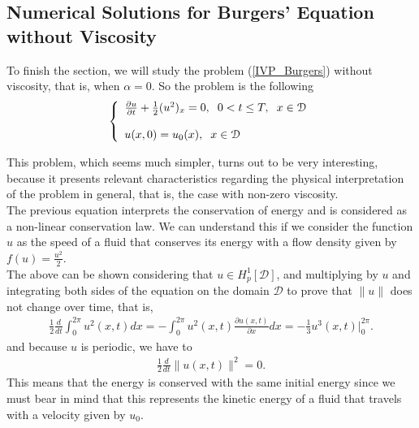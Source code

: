 \subsection{Numerical Solutions for Burgers' Equation without Viscosity}
	
	To finish the section, we will study the problem (\ref{IVP_Burgers}) without viscosity, that is, when $\alpha = 0$. So the problem is the following
	\begin{align}
	\label{IVP_Inviscid}
		\left \lbrace \begin{array}{ll}
			\frac{\partial u}{\partial t} + \frac{1}{2} (u^2)_x = 0, \hspace{2mm} 0 < t \leq T, \hspace{2mm} x \in \mathcal{D} \\
			\\
			u(x, 0) = u_0(x), \hspace{2mm} x \in \mathcal{D}
		\end{array}  \right .
	\end{align}
	
	This problem, which seems much simpler, turns out to be very interesting, because it presents relevant characteristics regarding the physical interpretation of the problem in general, that is, the case with non-zero viscosity. \\
	
	The previous equation interprets the conservation of energy and is considered as a non-linear conservation law. We can understand this if we consider the function $ u $ as the speed of a fluid that conserves its energy with a flow density given by $f(u) = \frac{u^2} {2}$. \\
	
	The above can be shown considering that $u \in H^1_p [\mathcal{D}]$, and multiplying by $u$ and integrating both sides of the equation on the domain $\mathcal{D}$ to prove that $\| u \|$ does not change over time, that is,
	\begin{align*}
		\frac{1}{2} \frac{d}{dt} \displaystyle \int_{0}^{2 \pi} u^2(x, t) dx = - \int_{0}^{2 \pi} u^2(x, t) \frac{\partial u(x, t)}{\partial x} dx = - \frac{1}{3} u^3(x, t) \Big|^{2 \pi}_{0}.
	\end{align*}
	and because $u$ is periodic, we have to
	\begin{align*}
		\frac{1}{2} \frac{d}{dt} \| u(x, t) \|^2 = 0.
	\end{align*}
	This means that the energy is conserved with the same initial energy since we must bear in mind that this represents the kinetic energy of a fluid that travels with a velocity given by $u_0$. \\
		
